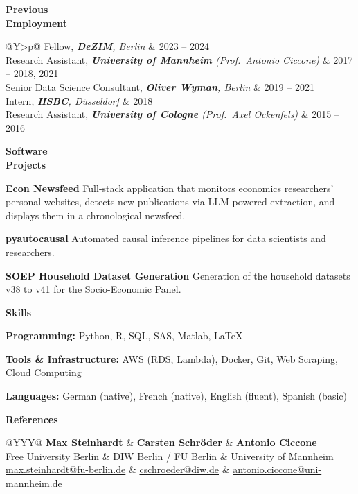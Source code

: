 \documentclass[a4paper,9pt]{extarticle}
\newlength{\lw}\setlength{\lw}{1.95cm}
\newlength{\sw}\setlength{\sw}{0.15cm}
\newlength{\cw}\setlength{\cw}{\dimexpr\textwidth-\lw-\sw\relax}
\newlength{\dw}\setlength{\dw}{3.5cm}
\newcommand{\cvsection}[2]{%
  \vspace{1.6em}%
  \noindent
  \parbox[t]{\lw}{\vspace{0pt}\raggedright\textbf{#1}}%
  \hspace{\sw}%
  \parbox[t]{\cw}{\vspace{0pt}\raggedright #2}%
  \par
}
\newcommand{\cvtabsection}[2]{%
  \vspace{1.6em}%
  \noindent
  \parbox[t]{\lw}{\vspace{0pt}\raggedright\textbf{#1}}%
  \hspace{\sw}%
  \parbox[t]{\cw}{\vspace{-3pt}\raggedright #2}%
  \par
}
\begin{document}
\cvtabsection{Previous\\Employment}{%
  \begin{tabularx}{\cw}{@{}Y>{\raggedleft\arraybackslash}p{\dw}@{}}
    Fellow, \textit{\textbf{DeZIM}, Berlin} & 2023 -- 2024 \\
    Research Assistant, \textit{\textbf{University of Mannheim} (Prof.\ Antonio Ciccone)} & 2017 -- 2018, 2021 \\
    Senior Data Science Consultant, \textit{\textbf{Oliver Wyman}, Berlin} & 2019 -- 2021 \\
    Intern, \textit{\textbf{HSBC}, D\"usseldorf} & 2018 \\
    Research Assistant, \textit{\textbf{University of Cologne} (Prof.\ Axel Ockenfels)} & 2015 -- 2016 \\
  \end{tabularx}%
}

\cvsection{Software\\Projects}{%
  \textbf{Econ Newsfeed}%
  \newline Full-stack application that monitors economics researchers' personal websites, detects new publications via LLM-powered extraction, and displays them in a chronological newsfeed.%
  \par\vspace{1.0em}%
  \textbf{pyautocausal}%
  \newline Automated causal inference pipelines for data scientists and researchers.%
  \par\vspace{1.0em}%
  \textbf{SOEP Household Dataset Generation}%
  \newline Generation of the household datasets v38 to v41 for the Socio-Economic Panel.%
}

\cvsection{Skills}{%
  \textbf{Programming:} Python, R, SQL, SAS, Matlab, \LaTeX%
  \par\vspace{0.6em}%
  \textbf{Tools \& Infrastructure:} AWS (RDS, Lambda), Docker, Git, Web Scraping, Cloud Computing%
  \par\vspace{0.6em}%
  \textbf{Languages:} German (native), French (native), English (fluent), Spanish (basic)%
}

\cvsection{References}{%
  \begin{tabularx}{\cw}{@{}YYY@{}}
    \textbf{Max Steinhardt} & \textbf{Carsten Schr\"oder} & \textbf{Antonio Ciccone} \\
    Free University Berlin & DIW Berlin / FU Berlin & University of Mannheim \\
    \href{mailto:max.steinhardt@fu-berlin.de}{\small max.steinhardt@fu-berlin.de} & \href{mailto:cschroeder@diw.de}{\small cschroeder@diw.de} & \href{mailto:antonio.ciccone@uni-mannheim.de}{\small antonio.ciccone@uni-mannheim.de} \\
  \end{tabularx}%
}
\end{document}
